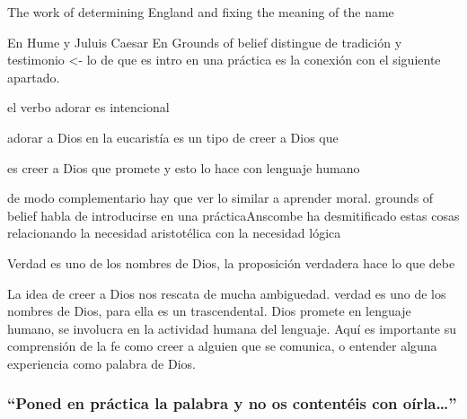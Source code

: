   The work of determining England and fixing the meaning of the name

  En Hume y Juluis Caesar
  En Grounds of belief distingue de tradición y testimonio <- lo de que es intro en una práctica es la conexión con el siguiente apartado.

  el verbo adorar es intencional

  adorar a Dios en la eucaristía es un tipo de creer a Dios que

  es creer a Dios que promete y esto lo hace con lenguaje humano

  de modo complementario hay que ver lo similar a aprender moral. grounds of belief habla de introducirse en una prácticaAnscombe ha desmitificado estas cosas relacionando la necesidad aristotélica con la necesidad lógica

  Verdad es uno de los nombres de Dios, la proposición verdadera hace lo que debe

  La idea de creer a Dios nos rescata de mucha ambiguedad.
  verdad es uno de los nombres de Dios, para ella es un trascendental. Dios promete en lenguaje humano, se involucra en la actividad humana del lenguaje. Aquí es importante su comprensión de la fe como creer a alguien que se comunica, o entender alguna experiencia como palabra de Dios.

\subsubsection{\enquote{Poned en práctica la palabra y no os contentéis con oírla\ldots}}
